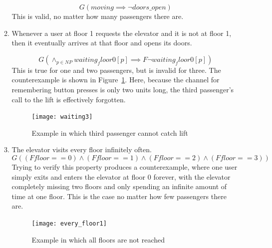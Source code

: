 \documentclass{article}
\begin{document}
\begin{enumerate}
\begin{enumerate}
      \[ G (moving \implies \neg doors\_open )\]
      This is valid, no matter how many passengers there are.

    \item Whenever a user at floor 1 requests the elevator and it is not at
      floor 1, then it eventually arrives at that floor and opens its doors.

      \[ G ( \wedge_{p \in NP} waiting_floor0[p] \implies F \neg waiting_floor0[p] )\]
      This is true for one and two passengers, but is invalid for three.
      The counterexample is shown in Figure~\ref{fig:waiting3}.
      Here, because the channel for remembering button presses is only
      two units long, the third passenger's call to the lift is effectively
      forgotten.
\begin{figure}
  \begin{center}
    \texttt{[image: waiting3]}
  \end{center}
  \caption{Example in which third passenger cannot catch lift}
  \label{fig:waiting3}
\end{figure}

    \item The elevator visits every floor infinitely often.
      \[G \left( (F floor == 0) \wedge (F floor == 1)
      \wedge (F floor == 2) \wedge (F floor == 3) \right) \]
      Trying to verify this property produces a counterexample, where one
      user simply exits and enters the elevator at floor 0
      forever, with the elevator completely missing two floors
      and only spending an infinite amount of time at one floor.
      This is the case no matter how few passengers there are.
\begin{figure}
  \begin{center}
    \texttt{[image: every\_floor1]}
  \end{center}
  \caption{Example in which all floors are not reached}
  \label{fig:everyf}
\end{figure}
  \end{enumerate}
\end{enumerate}

%
%
\end{document}
